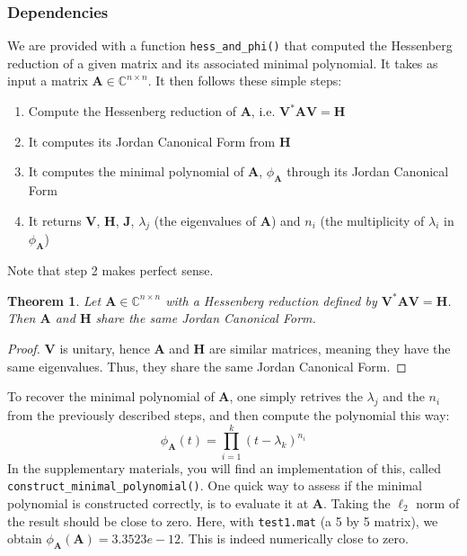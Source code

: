 \documentclass[11pt]{article}
\newtheorem{theorem}{Theorem}
\numberwithin{equation}{section}
\begin{document}
\subsubsection{Dependencies}
We are provided with a function \texttt{hess\_and\_phi()} that computed the Hessenberg reduction of a given matrix and its associated minimal polynomial. It takes as input a matrix $\mathbf{A}\in\mathbb{C}^{n\times n}$. It then follows these simple steps:
\begin{enumerate}
    \item Compute the Hessenberg reduction of $\mathbf{A}$, i.e. $\mathbf{V}^*\mathbf{A}\mathbf{V} = \mathbf{H}$
    \item It computes its Jordan Canonical Form from $\mathbf{H}$
    \item It computes the minimal polynomial of $\mathbf{A}$, $\phi_{\mathbf{A}}$ through its Jordan Canonical Form
    \item It returns $\mathbf{V}$, $\mathbf{H}$, $\mathbf{J}$, $\lambda_j$ (the eigenvalues of $\mathbf{A}$) and $n_i$ (the multiplicity of $\lambda_i$ in $\phi_{\mathbf{A}}$) 
\end{enumerate}
Note that step 2 makes perfect sense.
\begin{theorem}
    Let $\mathbf{A}\in\mathbb{C}^{n\times n}$ with a Hessenberg reduction defined by $\mathbf{V}^*\mathbf{A}\mathbf{V} = \mathbf{H}$. Then $\mathbf{A}$ and $\mathbf{H}$ share the same Jordan Canonical Form.
\end{theorem}
\begin{proof}
    $\mathbf{V}$ is unitary, hence $\mathbf{A}$ and $\mathbf{H}$ are similar matrices, meaning they have the same eigenvalues. Thus, they share the same Jordan Canonical Form.
\end{proof}
To recover the minimal polynomial of $\mathbf{A}$, one simply retrives the $\lambda_j$ and the $n_i$ from the previously described steps, and then compute the polynomial this way:
\begin{equation*}
    \phi_{\mathbf{A}}(t) = \prod_{i=1}^{k}(t-\lambda_k)^{n_i}
\end{equation*}
In the supplementary materials, you will find an implementation of this, called \texttt{construct\_minimal\_polynomial()}. One quick way to assess if the minimal polynomial is constructed correctly, is to evaluate it at $\mathbf{A}$. Taking the $\ell_2$ norm of the result should be close to zero. Here, with \texttt{test1.mat} (a 5 by 5 matrix), we obtain $\phi_{\mathbf{A}}(\mathbf{A}) = 3.3523e-12$. This is indeed numerically close to zero.
\end{document}
